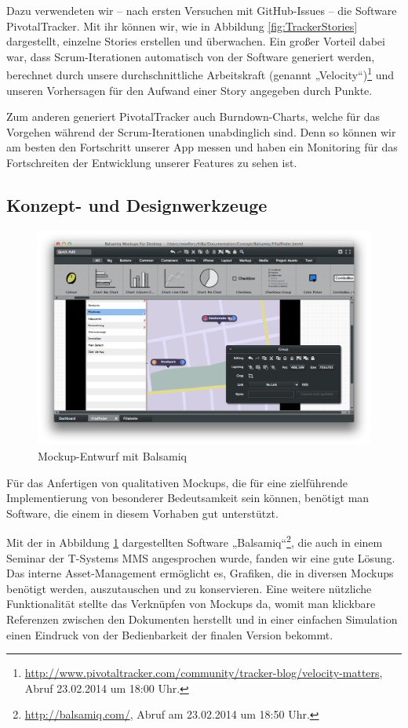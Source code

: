 	Dazu verwendeten wir – nach ersten Versuchen mit GitHub-Issues – die Software PivotalTracker. Mit ihr können wir, wie in Abbildung \ref{fig:TrackerStories} dargestellt, einzelne Stories erstellen und überwachen. Ein großer Vorteil dabei war, dass Scrum-Iterationen automatisch von der Software generiert werden, berechnet durch unsere durchschnittliche Arbeitskraft (genannt „Velocity“)\footnote{\url{http://www.pivotaltracker.com/community/tracker-blog/velocity-matters}, Abruf 23.02.2014 um 18:00 Uhr.} und unseren Vorhersagen für den Aufwand einer Story angegeben durch Punkte.

	Zum anderen generiert PivotalTracker auch Burndown-Charts, welche für das Vorgehen während der Scrum-Iterationen unabdinglich sind. Denn so können wir am besten den Fortschritt unserer App messen und haben ein Monitoring für das Fortschreiten der Entwicklung unserer Features zu sehen ist.

\subsection{Konzept- und Designwerkzeuge}
\begin{figure}[hb]
	\centering
	\includegraphics[scale=.3]{Pictures/BalsamiqEntwurf}
	\caption{Mockup-Entwurf mit Balsamiq\label{fig:BalsamiqEntwurf}}
\end{figure}
	
	Für das Anfertigen von qualitativen Mockups, die für eine zielführende Implementierung von besonderer Bedeutsamkeit sein können, benötigt man Software, die einem in diesem Vorhaben gut unterstützt.
	
	Mit der in Abbildung \ref{fig:BalsamiqEntwurf} dargestellten Software „Balsamiq“\footnote{\url{http://balsamiq.com/}, Abruf am 23.02.2014 um 18:50 Uhr.}, die auch in einem Seminar der T-Systems MMS angesprochen wurde, fanden wir eine gute Lösung. Das interne Asset-Management ermöglicht es, Grafiken, die in diversen Mockups benötigt werden, auszutauschen und zu konservieren. Eine weitere nützliche Funktionalität stellte das Verknüpfen von Mockups da, womit man klickbare Referenzen zwischen den Dokumenten herstellt und in einer einfachen Simulation einen Eindruck von der Bedienbarkeit der finalen Version bekommt.

